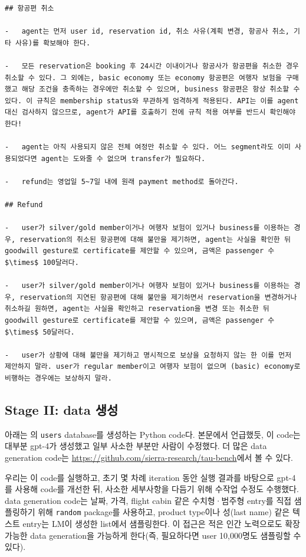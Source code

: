 \begin{verbatim}
## 항공편 취소

-   agent는 먼저 user id, reservation id, 취소 사유(계획 변경, 항공사 취소, 기타 사유)를 확보해야 한다.

-   모든 reservation은 booking 후 24시간 이내이거나 항공사가 항공편을 취소한 경우 취소할 수 있다. 그 외에는, basic economy 또는 economy 항공편은 여행자 보험을 구매했고 해당 조건을 충족하는 경우에만 취소할 수 있으며, business 항공편은 항상 취소할 수 있다. 이 규칙은 membership status와 무관하게 엄격하게 적용된다. API는 이를 agent 대신 검사하지 않으므로, agent가 API를 호출하기 전에 규칙 적용 여부를 반드시 확인해야 한다!

-   agent는 아직 사용되지 않은 전체 여정만 취소할 수 있다. 어느 segment라도 이미 사용되었다면 agent는 도와줄 수 없으며 transfer가 필요하다.

-   refund는 영업일 5~7일 내에 원래 payment method로 돌아간다.

## Refund

-   user가 silver/gold member이거나 여행자 보험이 있거나 business를 이용하는 경우, reservation의 취소된 항공편에 대해 불만을 제기하면, agent는 사실을 확인한 뒤 goodwill gesture로 certificate를 제안할 수 있으며, 금액은 passenger 수 $\times$ 100달러다.

-   user가 silver/gold member이거나 여행자 보험이 있거나 business를 이용하는 경우, reservation의 지연된 항공편에 대해 불만을 제기하면서 reservation을 변경하거나 취소하길 원하면, agent는 사실을 확인하고 reservation을 변경 또는 취소한 뒤 goodwill gesture로 certificate를 제안할 수 있으며, 금액은 passenger 수 $\times$ 50달러다.

-   user가 상황에 대해 불만을 제기하고 명시적으로 보상을 요청하지 않는 한 이를 먼저 제안하지 말라. user가 regular member이고 여행자 보험이 없으며 (basic) economy로 비행하는 경우에는 보상하지 말라.
\end{verbatim}

\newpage
\subsection{Stage II: data 생성} \label{sec:stage2}
아래는 \retail{}의 \texttt{users} database를 생성하는 Python code다. 본문에서 언급했듯, 이 code는 대부분 gpt-4가 생성했고 일부 사소한 부분만 사람이 수정했다. 더 많은 data generation code는 \url{https://github.com/sierra-research/tau-bench}에서 볼 수 있다.

우리는 이 code를 실행하고, 초기 몇 차례 iteration 동안 실행 결과를 바탕으로 gpt-4를 사용해 code를 개선한 뒤, 사소한 세부사항을 다듬기 위해 수작업 수정도 수행했다. data generation code는 날짜, 가격, flight cabin 같은 수치형·범주형 entry를 직접 샘플링하기 위해 \texttt{random} package를 사용하고, product type이나 성(last name) 같은 텍스트 entry는 LM이 생성한 list에서 샘플링한다. 이 접근은 적은 인간 노력으로도 확장 가능한 data generation을 가능하게 한다(즉, 필요하다면 user 10,000명도 샘플링할 수 있다).


